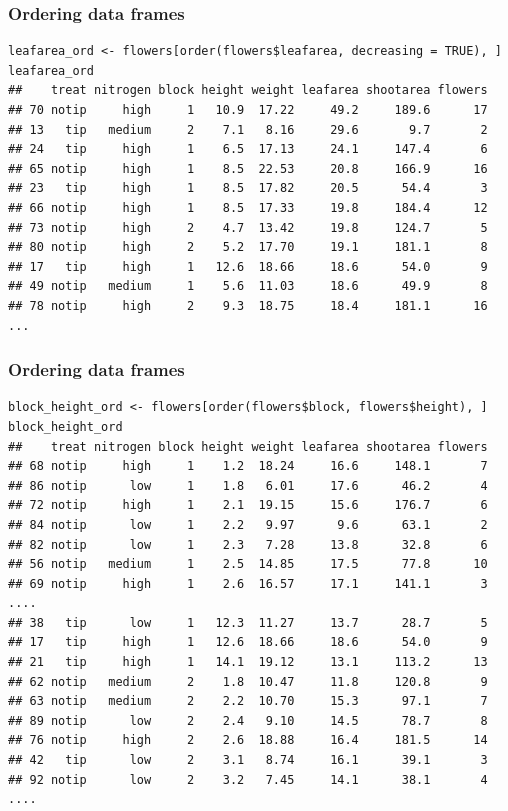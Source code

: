 \documentclass{beamer}
\newcommand{\lsting}[1]{\begin{lstlisting}[basicstyle=#1]}
\newcommand{\bfr}[1]{\begin{frame}[fragile]\frametitle{{ #1 }}}
\begin{document}
\bfr{Ordering data frames}
\lsting{\tiny}
leafarea_ord <- flowers[order(flowers$leafarea, decreasing = TRUE), ]        
leafarea_ord
##    treat nitrogen block height weight leafarea shootarea flowers
## 70 notip     high     1   10.9  17.22     49.2     189.6      17
## 13   tip   medium     2    7.1   8.16     29.6       9.7       2
## 24   tip     high     1    6.5  17.13     24.1     147.4       6
## 65 notip     high     1    8.5  22.53     20.8     166.9      16
## 23   tip     high     1    8.5  17.82     20.5      54.4       3
## 66 notip     high     1    8.5  17.33     19.8     184.4      12
## 73 notip     high     2    4.7  13.42     19.8     124.7       5
## 80 notip     high     2    5.2  17.70     19.1     181.1       8
## 17   tip     high     1   12.6  18.66     18.6      54.0       9
## 49 notip   medium     1    5.6  11.03     18.6      49.9       8
## 78 notip     high     2    9.3  18.75     18.4     181.1      16
...
\end{lstlisting}
\end{frame}



\bfr{Ordering data frames}
\lsting{\tiny}
block_height_ord <- flowers[order(flowers$block, flowers$height), ]        
block_height_ord
##    treat nitrogen block height weight leafarea shootarea flowers
## 68 notip     high     1    1.2  18.24     16.6     148.1       7
## 86 notip      low     1    1.8   6.01     17.6      46.2       4
## 72 notip     high     1    2.1  19.15     15.6     176.7       6
## 84 notip      low     1    2.2   9.97      9.6      63.1       2
## 82 notip      low     1    2.3   7.28     13.8      32.8       6
## 56 notip   medium     1    2.5  14.85     17.5      77.8      10
## 69 notip     high     1    2.6  16.57     17.1     141.1       3
....
## 38   tip      low     1   12.3  11.27     13.7      28.7       5
## 17   tip     high     1   12.6  18.66     18.6      54.0       9
## 21   tip     high     1   14.1  19.12     13.1     113.2      13
## 62 notip   medium     2    1.8  10.47     11.8     120.8       9
## 63 notip   medium     2    2.2  10.70     15.3      97.1       7
## 89 notip      low     2    2.4   9.10     14.5      78.7       8
## 76 notip     high     2    2.6  18.88     16.4     181.5      14
## 42   tip      low     2    3.1   8.74     16.1      39.1       3
## 92 notip      low     2    3.2   7.45     14.1      38.1       4
....
\end{lstlisting}
\end{frame}
\end{document}
